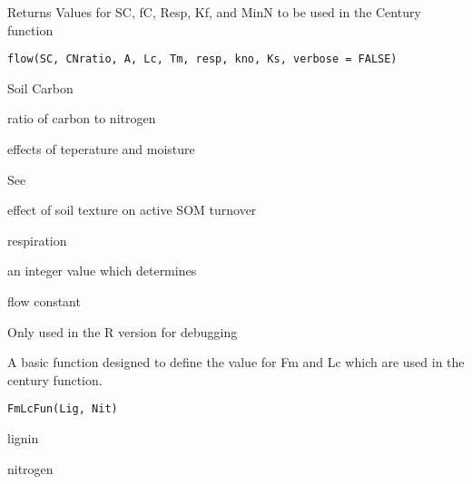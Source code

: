\documentclass[letterpaper]{book}
\begin{document}
%
\begin{Description}\relax
Returns Values for SC, fC, Resp, Kf, and MinN to be used in
the Century function
\end{Description}
%
\begin{Usage}
\begin{verbatim}
flow(SC, CNratio, A, Lc, Tm, resp, kno, Ks, verbose = FALSE)
\end{verbatim}
\end{Usage}
%
\begin{Arguments}
\begin{ldescription}
\item[\code{SC}] Soil Carbon

\item[\code{CNratio}] ratio of carbon to nitrogen

\item[\code{A}] effects of teperature and moisture

\item[\code{Lc}] See 

\item[\code{TM}] effect of soil texture on active SOM turnover

\item[\code{resp}] respiration

\item[\code{kno}] an integer value which determines

\item[\code{Ks}] flow constant

\item[\code{verbose}] Only used in the R version for debugging
\end{ldescription}
\end{Arguments}
%
\begin{Description}\relax
A basic function designed to define the value for Fm and Lc
which are used in the century function.
\end{Description}
%
\begin{Usage}
\begin{verbatim}
FmLcFun(Lig, Nit)
\end{verbatim}
\end{Usage}
%
\begin{Arguments}
\begin{ldescription}
\item[\code{Lig}] lignin

\item[\code{Nit}] nitrogen
\end{ldescription}
\end{Arguments}
\end{document}
